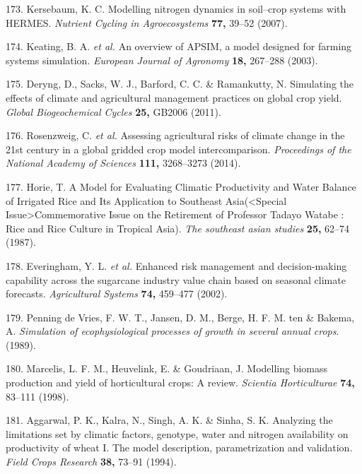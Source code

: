 \documentclass[12pt,]{book}
\begin{document}
\hypertarget{ref-kersebaum_modelling_2007}{}
173. Kersebaum, K. C. Modelling nitrogen dynamics in soil--crop systems
with HERMES. \emph{Nutrient Cycling in Agroecosystems} \textbf{77,}
39--52 (2007).

\hypertarget{ref-keating_overview_2003}{}
174. Keating, B. A. \emph{et al.} An overview of APSIM, a model designed
for farming systems simulation. \emph{European Journal of Agronomy}
\textbf{18,} 267--288 (2003).

\hypertarget{ref-deryng_simulating_2011}{}
175. Deryng, D., Sacks, W. J., Barford, C. C. \& Ramankutty, N.
Simulating the effects of climate and agricultural management practices
on global crop yield. \emph{Global Biogeochemical Cycles} \textbf{25,}
GB2006 (2011).

\hypertarget{ref-rosenzweig_assessing_2014}{}
176. Rosenzweig, C. \emph{et al.} Assessing agricultural risks of
climate change in the 21st century in a global gridded crop model
intercomparison. \emph{Proceedings of the National Academy of Sciences}
\textbf{111,} 3268--3273 (2014).

\hypertarget{ref-horie_model_1987}{}
177. Horie, T. A Model for Evaluating Climatic Productivity and Water
Balance of Irrigated Rice and Its Application to Southeast
Asia(\textless{}Special Issue\textgreater{}Commemorative Issue on the
Retirement of Professor Tadayo Watabe : Rice and Rice Culture in
Tropical Asia). \emph{The southeast asian studies} \textbf{25,} 62--74
(1987).

\hypertarget{ref-everingham_enhanced_2002}{}
178. Everingham, Y. L. \emph{et al.} Enhanced risk management and
decision-making capability across the sugarcane industry value chain
based on seasonal climate forecasts. \emph{Agricultural Systems}
\textbf{74,} 459--477 (2002).

\hypertarget{ref-penning_de_vries_simulation_1989}{}
179. Penning de Vries, F. W. T., Jansen, D. M., Berge, H. F. M. ten \&
Bakema, A. \emph{Simulation of ecophysiological processes of growth in
several annual crops}. (1989).

\hypertarget{ref-marcelis_modelling_1998}{}
180. Marcelis, L. F. M., Heuvelink, E. \& Goudriaan, J. Modelling
biomass production and yield of horticultural crops: A review.
\emph{Scientia Horticulturae} \textbf{74,} 83--111 (1998).

\hypertarget{ref-aggarwal_analyzing_1994}{}
181. Aggarwal, P. K., Kalra, N., Singh, A. K. \& Sinha, S. K. Analyzing
the limitations set by climatic factors, genotype, water and nitrogen
availability on productivity of wheat I. The model description,
parametrization and validation. \emph{Field Crops Research} \textbf{38,}
73--91 (1994).
\end{document}
